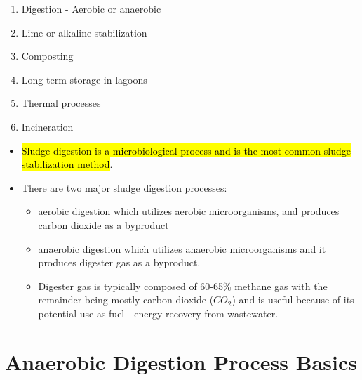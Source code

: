 		\begin{enumerate}
		\item Digestion - Aerobic or anaerobic
		\item Lime or alkaline stabilization
		\item Composting
		\item Long term storage in lagoons
		\item Thermal processes
		\item Incineration
		\end{enumerate}
		\begin{itemize}
		\item \hl{Sludge digestion is a microbiological process and is the most common sludge stabilization method}.
		\item There are two major sludge digestion processes:
			\begin{itemize}
			\item aerobic digestion which utilizes aerobic microorganisms, and produces carbon dioxide as a byproduct
			\item anaerobic digestion which utilizes anaerobic microorganisms and it produces digester gas as a byproduct.
			\item Digester gas is typically composed of 60-65\% methane gas with the remainder being mostly carbon dioxide ($CO_2$) and is useful because of its potential use as fuel - energy recovery from wastewater.
			\end{itemize}
		\end{itemize}

\section{Anaerobic Digestion Process Basics}

